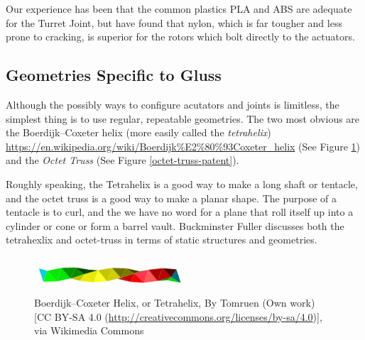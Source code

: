 \documentclass[12pt]{article}
\begin{document}
 Our experience has been that the common plastics PLA and ABS are adequate for the Turret Joint,
 but have found that nylon, which is far tougher and less prone to cracking, is superior for the
 rotors which bolt directly to the actuators.

\subsection{Geometries Specific to Gluss}

Although the possibly ways to configure acutators and joints is limitless, the simplest thing is to
use regular, repeatable geometries. The two most obvious are the Boerdijk–Coxeter helix
(more easily called the \textit{tetrahelix})
\url{https://en.wikipedia.org/wiki/Boerdijk%E2%80%93Coxeter_helix}
    (See Figure \ref{Boerdijk-Coxeter-Helix}) and the \emph{Octet Truss}
    \cite{richard1961synergetic} (See Figure \ref{octet-truss-patent}).
    
Roughly speaking, the Tetrahelix is a good way to make a long shaft or tentacle, and the octet truss
is a good way to make a planar shape. The purpose of a tentacle is to curl, and the we have no word for
a plane that roll itself up into a cylinder or cone or form a barrel vault. Buckminster Fuller discusses
both the tetrahexlix and octet-truss \cite{fuller1982synergetics} in terms of static structures and geometries.

\begin{figure}[!ht]
  \centering
    \includegraphics[width=0.5\textwidth]{Coxeter_helix_3_colors_cw.png}
    \caption[Boerdijk–Coxeter Helix]{Boerdijk–Coxeter Helix, or Tetrahelix, By Tomruen (Own work)
      [CC BY-SA 4.0 (\href{http://creativecommons.org/licenses/by-sa/4.0}{http://creativecommons.org/licenses/by-sa/4.0})], via Wikimedia Commons}
      \label{Boerdijk-Coxeter-Helix}
\end{figure}
\end{document}
